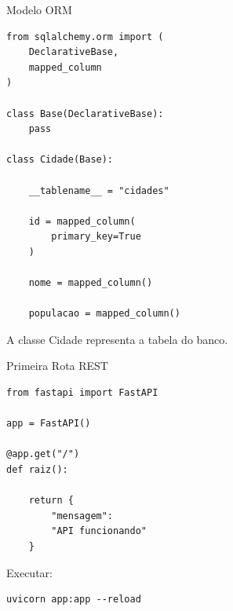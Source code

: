 \documentclass{beamer}
\begin{document}
\begin{frame}[fragile]{Modelo ORM}

\begin{verbatim}
from sqlalchemy.orm import (
    DeclarativeBase,
    mapped_column
)

class Base(DeclarativeBase):
    pass

class Cidade(Base):

    __tablename__ = "cidades"

    id = mapped_column(
        primary_key=True
    )

    nome = mapped_column()

    populacao = mapped_column()
\end{verbatim}

\vspace{0.2cm}

A classe Cidade representa a tabela do banco.

\end{frame}

\begin{frame}[fragile]{Primeira Rota REST}

\begin{verbatim}
from fastapi import FastAPI

app = FastAPI()

@app.get("/")
def raiz():

    return {
        "mensagem":
        "API funcionando"
    }
\end{verbatim}

\vspace{0.3cm}

Executar:

\begin{verbatim}
uvicorn app:app --reload
\end{verbatim}

\end{frame}
\end{document}
